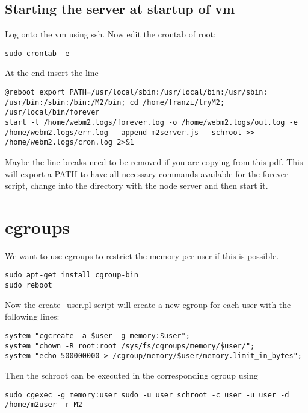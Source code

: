 \documentclass[a4paper]{book}
\begin{document}
\section{Starting the server at startup of vm}
Log onto the vm using ssh. Now edit the crontab of root:
\begin{verbatim}
sudo crontab -e
\end{verbatim}
At the end insert the line
\begin{verbatim}
@reboot export PATH=/usr/local/sbin:/usr/local/bin:/usr/sbin:
/usr/bin:/sbin:/bin:/M2/bin; cd /home/franzi/tryM2; /usr/local/bin/forever
start -l /home/webm2.logs/forever.log -o /home/webm2.logs/out.log -e
/home/webm2.logs/err.log --append m2server.js --schroot >>
/home/webm2.logs/cron.log 2>&1
\end{verbatim}
Maybe the line breaks need to be removed if you are copying from this pdf.
This will export a PATH to have all necessary commands available for the forever script, change into the directory with the node server and then start it.


\chapter{cgroups}
We want to use cgroups to restrict the memory per user if this is possible.
\begin{verbatim}
sudo apt-get install cgroup-bin 
sudo reboot
\end{verbatim}

Now the create\_user.pl script will create a new cgroup for each user with the following lines:
\begin{verbatim}
system "cgcreate -a $user -g memory:$user";
system "chown -R root:root /sys/fs/cgroups/memory/$user/";
system "echo 500000000 > /cgroup/memory/$user/memory.limit_in_bytes";
\end{verbatim}

Then the schroot can be executed in the corresponding cgroup using
\begin{verbatim}
sudo cgexec -g memory:user sudo -u user schroot -c user -u user -d /home/m2user -r M2
\end{verbatim}
\end{document}

